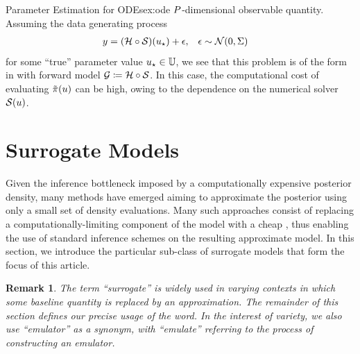 \documentclass[12pt]{article}
\newtheorem{remark}{Remark}
\begin{document}
\begin{examplebox}{Parameter Estimation for ODEs}{ex:ode}
$P$-dimensional observable quantity. Assuming the data generating process
\begin{align}
&y = (\mathcal{H} \circ \mathcal{S})(u_{\star}) + \epsilon, 
&&\epsilon \sim \mathcal{N}(0, \Sigma) \label{ode_inv_prob} 
\end{align}
for some ``true'' parameter value $u_{\star} \in \mathbb{U}$, we see that this problem is of the form in 
 with forward model $\mathcal{G} \coloneqq \mathcal{H} \circ \mathcal{S}$.
In this case, the computational
cost of evaluating $\tilde{\pi}(u)$ can be high, owing to the dependence on the numerical solver $\mathcal{S}(u)$.
\end{examplebox}

\section{Surrogate Models} \label{sec:surrogates}
Given the inference bottleneck imposed by a computationally expensive posterior density, many methods have emerged
aiming to approximate the posterior using only a small set of density evaluations. Many such approaches 
consist of replacing a computationally-limiting component of the model with a cheap , thus enabling 
the use of standard inference schemes on the resulting approximate model. In this section, we introduce the particular
sub-class of surrogate models that form the focus of this article.

\begin{remark}
The term ``surrogate'' is widely used in varying contexts in which some baseline quantity is replaced by an 
approximation. The remainder of this section defines our precise usage of the word. In the interest of variety, we 
also use ``emulator'' as a synonym, with ``emulate'' referring to the process of constructing an emulator. 
\end{remark}
\end{document}
